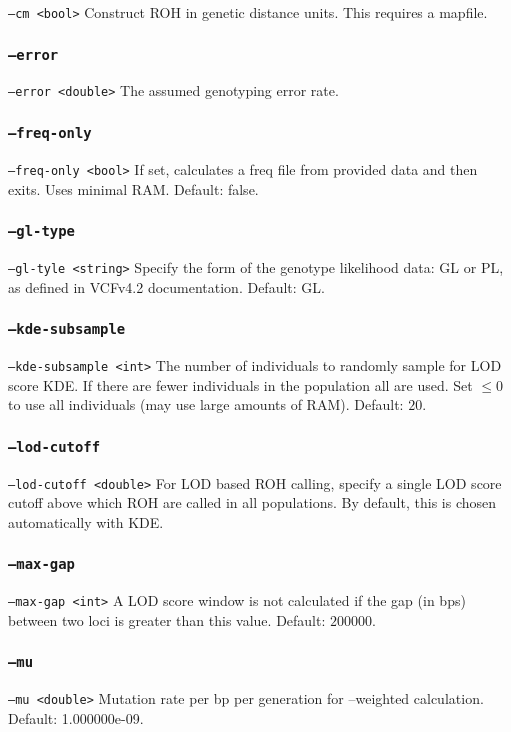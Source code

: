 \documentclass[12pt]{article}%
\begin{document}
{\tt --cm <bool>} Construct ROH in genetic distance units. This requires a mapfile.

\subsubsection{{\tt --error}}

{\tt --error <double>} The assumed genotyping error rate.

\subsubsection{{\tt --freq-only}}

{\tt --freq-only <bool>} If set, calculates a freq file from provided data and then exits. Uses minimal RAM. Default: false.

\subsubsection{{\tt --gl-type}}

{\tt --gl-tyle <string>} Specify the form of the genotype likelihood data: GL or PL, as defined in VCFv4.2 documentation. Default: GL.

\subsubsection{{\tt --kde-subsample}}

{\tt --kde-subsample <int>} The number of individuals to randomly sample for LOD score KDE. If there are fewer individuals in the population all are used. Set $\le 0$ to use all individuals (may use large amounts of RAM). Default: $20$.

\subsubsection{{\tt --lod-cutoff}}
{\tt --lod-cutoff <double>} For LOD based ROH calling, specify a single LOD score cutoff above which ROH are called in all populations.  By default, this is chosen automatically with KDE.

\subsubsection{{\tt --max-gap}}
{\tt --max-gap <int>} A LOD score window is not calculated if the gap (in bps) between two loci is greater than this value. Default: $200000$.

\subsubsection{{\tt --mu}}
{\tt --mu <double>} Mutation rate per bp per generation for --weighted calculation. Default: 1.000000e-09.
\end{document}
